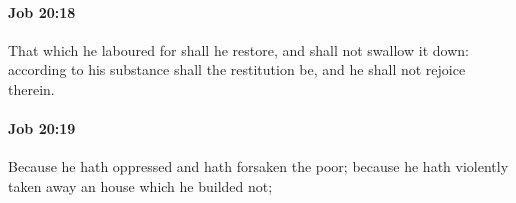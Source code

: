 		\paragraph{Job 20:18} %
			\label{JOB-20-18}

			That which he laboured for shall he restore, and shall not swallow it down: according to his substance shall the restitution be, and he shall not rejoice therein.


		\paragraph{Job 20:19} %
			\label{JOB-20-19}

			Because he hath oppressed and hath forsaken the poor; because he hath violently taken away an house which he builded not;


